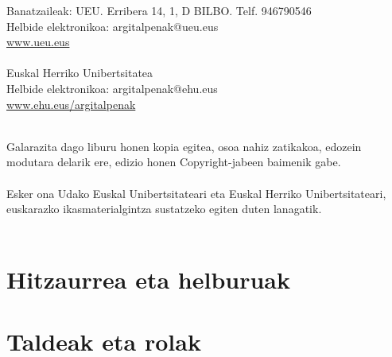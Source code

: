 \documentclass[12pt,fleqn]{book} %
\begin{document}
\vspace{0.5cm}

\noindent Banatzaileak: UEU. Erribera 14, 1, D BILBO. Telf. 946790546\\
\hangindent=2.5cm Helbide elektronikoa: argitalpenak@ueu.eus\\
\url{www.ueu.eus}\\ \\
Euskal Herriko Unibertsitatea\\
Helbide elektronikoa: argitalpenak@ehu.eus\\
\url{www.ehu.eus/argitalpenak}\\ \\

\vspace{0.5cm}

\noindent Galarazita dago liburu honen kopia egitea, osoa nahiz zatikakoa, edozein modutara delarik ere, edizio honen Copyright-jabeen baimenik gabe.\\ \\

\newpage
\noindent Esker ona Udako Euskal Unibertsitateari eta Euskal Herriko Unibertsitateari, euskarazko ikasmaterialgintza sustatzeko egiten duten lanagatik.\\ \\

\pagestyle{empty}
\tableofcontents
\cleardoublepage
\pagestyle{fancy}


\chapter{Hitzaurrea eta helburuak}\label{cha:hitzaurrea}


\chapter{Taldeak eta rolak}\label{cha:taldeak}

\end{document}
